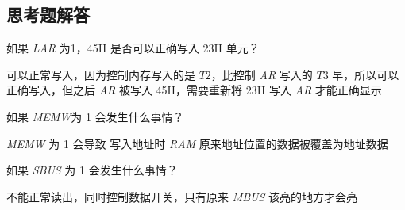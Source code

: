         \subsection{思考题解答}
        \begin{problem}
            如果 \textit{LAR} 为1，45H 是否可以正确写入 23H 单元？
        \end{problem}
        \begin{solution}
            可以正常写入，因为控制内存写入的是 $T2$，比控制 \textit{AR} 写入的 $T3$ 早，所以可以正确写入，但之后 \textit{AR} 被写入 45H，需要重新将 23H 写入 \textit{AR} 才能正确显示
        \end{solution}
        \begin{problem}
            如果 \textit{MEMW}为 1 会发生什么事情？
        \end{problem}
        \begin{solution}
            \textit{MEMW} 为 1 会导致 写入地址时 \textit{RAM} 原来地址位置的数据被覆盖为地址数据
        \end{solution}
        \begin{problem}
            如果 \textit{SBUS} 为 1 会发生什么事情？
        \end{problem}
        \begin{solution}
            不能正常读出，同时控制数据开关，只有原来 \textit{MBUS} 该亮的地方才会亮
        \end{solution}
    
